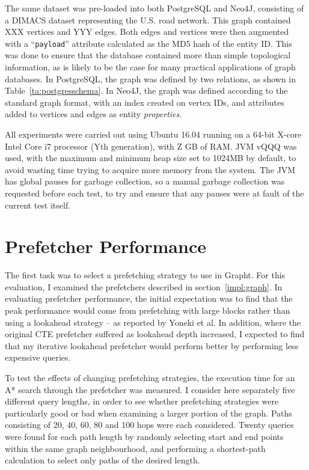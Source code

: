 The same dataset was pre-loaded into both PostgreSQL and Neo4J, consisting of
a DIMACS dataset representing the U.S. road network\cite{dimacs}. This graph
contained XXX vertices and YYY edges. Both edges and vertices were then
augmented with a ``\texttt{payload}'' attribute calculated as the MD5 hash of the
entity ID. This was done to ensure that the database contained more than
simple topological information, as is likely to be the case for many practical
applications of graph databases. In PostgreSQL, the graph was defined by two
relations, as shown in Table~\ref{ta:postgresschema}. In Neo4J, the graph was
defined according to the standard graph format, with an index created on
vertex IDs, and attributes added to vertices and edges as entity
\textit{properties}.

All experiments were carried out using Ubuntu 16.04 running on a 64-bit X-core
Intel Core i7 processor (Yth generation), with Z GB of RAM. JVM vQQQ was used,
with the maximum and minimum heap size set to 1024MB by default, to avoid
wasting time trying to acquire more memory from the system. The JVM has global
pauses for garbage collection, so a manual garbage collection was requested
before each test, to try and ensure that any pauses were at fault of the
current test itself.


\section{Prefetcher Performance}
\label{sec:prefetcher_performance}

The first task was to select a prefetching strategy to use in Grapht. For this
evaluation, I examined the prefetchers described in section~\ref{impl:graph}.
In evaluating prefetcher performance, the initial expectation was to find that
the peak performance would come from prefetching with large blocks rather than
using a lookahead strategy -- as reported by Yoneki et al. In addition, where
the original CTE prefetcher suffered as lookahead depth increased, I expected
to find that my iterative lookahead prefetcher would perform better by
performing less expensive queries.

To test the effects of changing prefetching strategies, the execution time for
an A* search through the prefetcher was measured. I consider here separately
five different query lengths, in order to see whether prefetching strategies
were particularly good or bad when examining  a larger portion of the graph.
Paths consisting of 20, 40, 60, 80 and 100 hops were each considered. Twenty
queries were found for each path length by randomly selecting start and end
points within the same graph neighbourhood, and performing a shortest-path
calculation to select only paths of the desired length.

